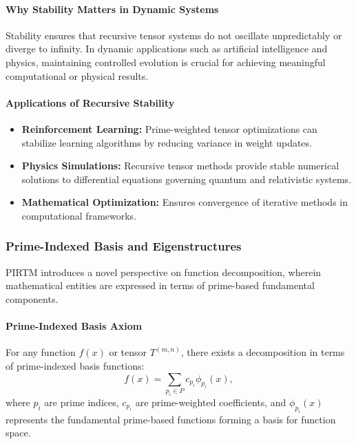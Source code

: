 \documentclass[12pt]{article}
\begin{document}
\paragraph{Why Stability Matters in Dynamic Systems}
Stability ensures that recursive tensor systems do not oscillate unpredictably or diverge to infinity. In dynamic applications such as artificial intelligence and physics, maintaining controlled evolution is crucial for achieving meaningful computational or physical results.

\paragraph{Applications of Recursive Stability}
\begin{itemize}
    \item \textbf{Reinforcement Learning:} Prime-weighted tensor optimizations can stabilize learning algorithms by reducing variance in weight updates.
    \item \textbf{Physics Simulations:} Recursive tensor methods provide stable numerical solutions to differential equations governing quantum and relativistic systems.
    \item \textbf{Mathematical Optimization:} Ensures convergence of iterative methods in computational frameworks.
\end{itemize}

\subsubsection{Prime-Indexed Basis and Eigenstructures}

PIRTM introduces a novel perspective on function decomposition, wherein mathematical entities are expressed in terms of prime-based fundamental components.

\paragraph{Prime-Indexed Basis Axiom}
For any function \( f(x) \) or tensor \( T^{(m,n)} \), there exists a decomposition in terms of prime-indexed basis functions:
\begin{equation}
    f(x) = \sum_{p_i \in P} c_{p_i} \phi_{p_i}(x),
\end{equation}
where \( p_i \) are prime indices, \( c_{p_i} \) are prime-weighted coefficients, and \( \phi_{p_i}(x) \) represents the fundamental prime-based functions forming a basis for function space.
\end{document}
